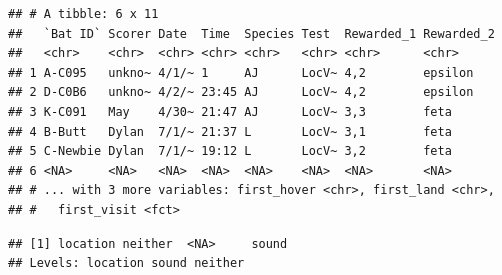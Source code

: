 \documentclass[]{article}
\newenvironment{Shaded}{\begin{snugshade}}{\end{snugshade}}
\newcommand{\KeywordTok}[1]{\textcolor[rgb]{0.13,0.29,0.53}{\textbf{{#1}}}}
\newcommand{\DataTypeTok}[1]{\textcolor[rgb]{0.13,0.29,0.53}{{#1}}}
\newcommand{\StringTok}[1]{\textcolor[rgb]{0.31,0.60,0.02}{{#1}}}
\newcommand{\CommentTok}[1]{\textcolor[rgb]{0.56,0.35,0.01}{\textit{{#1}}}}
\newcommand{\NormalTok}[1]{{#1}}
\begin{document}
\begin{Shaded}
\end{Shaded}

\begin{verbatim}
## # A tibble: 6 x 11
##   `Bat ID` Scorer Date  Time  Species Test  Rewarded_1 Rewarded_2
##   <chr>    <chr>  <chr> <chr> <chr>   <chr> <chr>      <chr>     
## 1 A-C095   unkno~ 4/1/~ 1     AJ      LocV~ 4,2        epsilon   
## 2 D-C0B6   unkno~ 4/2/~ 23:45 AJ      LocV~ 4,2        epsilon   
## 3 K-C091   May    4/30~ 21:47 AJ      LocV~ 3,3        feta      
## 4 B-Butt   Dylan  7/1/~ 21:37 L       LocV~ 3,1        feta      
## 5 C-Newbie Dylan  7/1/~ 19:12 L       LocV~ 3,2        feta      
## 6 <NA>     <NA>   <NA>  <NA>  <NA>    <NA>  <NA>       <NA>      
## # ... with 3 more variables: first_hover <chr>, first_land <chr>,
## #   first_visit <fct>
\end{verbatim}

\begin{Shaded}
\end{Shaded}

\begin{verbatim}
## [1] location neither  <NA>     sound   
## Levels: location sound neither
\end{verbatim}
\end{document}
